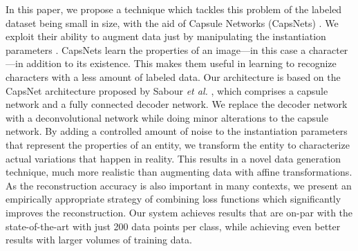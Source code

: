 In this paper, we propose a technique which tackles this problem of the labeled dataset being small in size, with the aid of Capsule Networks (CapsNets) \cite{sabour2017dynamic}. We exploit their ability to augment data just by manipulating the instantiation parameters \cite{hinton2011transforming}. CapsNets learn the properties of an image---in this case a character---in addition to its existence. This makes them useful in learning to recognize characters with a less amount of labeled data. Our architecture is based on the CapsNet architecture proposed by Sabour \textit{et al.} \cite{sabour2017dynamic}, which comprises a capsule network and a fully connected decoder network. We replace the decoder network with a deconvolutional network while doing minor alterations to the capsule network. By adding a controlled amount of noise to the instantiation parameters that represent the properties of an entity, we transform the entity to characterize actual variations that happen in reality.  This results in a novel data generation technique, much more realistic than augmenting data with affine transformations. As the reconstruction accuracy is also important in many contexts, we present an empirically appropriate strategy of combining loss functions which significantly improves the reconstruction. 
Our system achieves results that are on-par with the state-of-the-art with just 200 data points per class, while achieving even better results with larger volumes of training data. 





